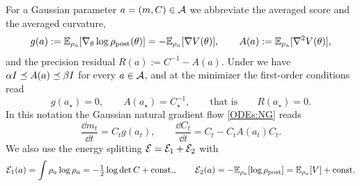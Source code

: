 For a Gaussian parameter $a=(m,C)\in\mathcal{A}$ we abbreviate the averaged score and the
averaged curvature,
\begin{equation}\label{eq:gA}
    g(a) := \mathbb{E}_{\rho_a}[\nabla_\theta\log\rho_{\mathrm{post}}(\theta)]
          = -\mathbb{E}_{\rho_a}[\nabla V(\theta)],
    \qquad
    A(a) := \mathbb{E}_{\rho_a}[\nabla^2V(\theta)],
\end{equation}
and the precision residual $R(a) := C^{-1}-A(a)$. Under
 we have $\alpha I\preceq A(a)\preceq\beta I$ for every
$a\in\mathcal{A}$, and at the minimizer the first-order conditions read
\begin{equation}\label{eq:first-order}
    g(a_\star)=0,
    \qquad
    A(a_\star)=C_\star^{-1},
    \qquad\text{that is}\qquad
    R(a_\star)=0 .
\end{equation}
In this notation the Gaussian natural gradient flow \eqref{ODEs:NG} reads
\begin{equation}\label{eq:NG-compact}
    \frac{\dd m_t}{\dd t}=C_tg(a_t),
    \qquad
    \frac{\dd C_t}{\dd t}=C_t-C_tA(a_t)C_t .
\end{equation}
We also use the energy splitting $\mathcal{E} = \mathcal{E}_1+\mathcal{E}_2$ with
\begin{equation}\label{eq:E-split}
    \mathcal{E}_1(a)=\int\rho_a\log\rho_a
    =-\tfrac12\log\det C+\mathrm{const.},
    \qquad
    \mathcal{E}_2(a)=-\mathbb{E}_{\rho_a}[\log\rho_{\mathrm{post}}]
    =\mathbb{E}_{\rho_a}[V]+\mathrm{const.}
\end{equation}

